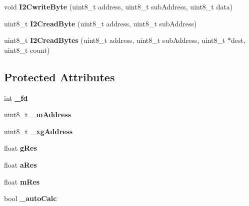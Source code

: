 \begin{DoxyCompactItemize}
\item 
void {\bfseries I2\+Cwrite\+Byte} (uint8\+\_\+t address, uint8\+\_\+t sub\+Address, uint8\+\_\+t data)\hypertarget{classLSM9DS1_a8e66108a002cc15ec4c0db0a608d20c6}{}\label{classLSM9DS1_a8e66108a002cc15ec4c0db0a608d20c6}

\item 
uint8\+\_\+t {\bfseries I2\+Cread\+Byte} (uint8\+\_\+t address, uint8\+\_\+t sub\+Address)\hypertarget{classLSM9DS1_a7fc046d4b335494331905fdeb5c81c9e}{}\label{classLSM9DS1_a7fc046d4b335494331905fdeb5c81c9e}

\item 
uint8\+\_\+t {\bfseries I2\+Cread\+Bytes} (uint8\+\_\+t address, uint8\+\_\+t sub\+Address, uint8\+\_\+t $\ast$dest, uint8\+\_\+t count)\hypertarget{classLSM9DS1_adfc9a22290daddd7787e8023fa8f12cc}{}\label{classLSM9DS1_adfc9a22290daddd7787e8023fa8f12cc}

\end{DoxyCompactItemize}
\subsection*{Protected Attributes}
\begin{DoxyCompactItemize}
\item 
int {\bfseries \+\_\+fd}\hypertarget{classLSM9DS1_a8a6a3c8b294acfcf11342f602864dc42}{}\label{classLSM9DS1_a8a6a3c8b294acfcf11342f602864dc42}

\item 
uint8\+\_\+t {\bfseries \+\_\+m\+Address}\hypertarget{classLSM9DS1_a7141933a2ccde95976e4eecd598ecb17}{}\label{classLSM9DS1_a7141933a2ccde95976e4eecd598ecb17}

\item 
uint8\+\_\+t {\bfseries \+\_\+xg\+Address}\hypertarget{classLSM9DS1_ac78b7fab605570a16433a4636f91451e}{}\label{classLSM9DS1_ac78b7fab605570a16433a4636f91451e}

\item 
float {\bfseries g\+Res}\hypertarget{classLSM9DS1_a2d8654ebb35177088a67e67a944bd998}{}\label{classLSM9DS1_a2d8654ebb35177088a67e67a944bd998}

\item 
float {\bfseries a\+Res}\hypertarget{classLSM9DS1_acdc1f9b300b3c349e17dd21c9bb37c40}{}\label{classLSM9DS1_acdc1f9b300b3c349e17dd21c9bb37c40}

\item 
float {\bfseries m\+Res}\hypertarget{classLSM9DS1_aac7ae43adf399e8052464b966aec8472}{}\label{classLSM9DS1_aac7ae43adf399e8052464b966aec8472}

\item 
bool {\bfseries \+\_\+auto\+Calc}\hypertarget{classLSM9DS1_a8460d00ea0bb496c5d49190a34e54588}{}\label{classLSM9DS1_a8460d00ea0bb496c5d49190a34e54588}

\end{DoxyCompactItemize}


